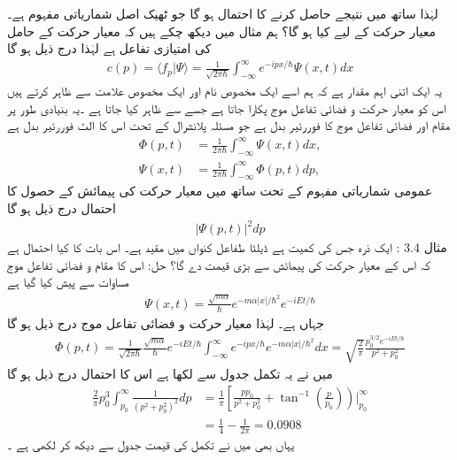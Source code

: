 لہٰذا ساتھ  میں نتیجے حاصل کرنے کا احتمال  ہو گا جو ٹھیک اصل شماریاتی مفہوم ہے۔
معیار حرکت کے لیے کیا ہو گا؟ ہم مثال  میں دیکھ چکے ہیں کہ معیار حرکت کے حامل کی امتیازی تفاعل  ہے لہٰذا درج ذیل ہو گا
\begin{align}
c(p) = \langle f_{p}  | \Psi \rangle = \frac{1}{\sqrt{2\pi\hbar}} \int_{-\infty}^{\infty} e^{-ipx/\hbar} \Psi (x,t)dx
\end{align}
یہ ایک اتنی اہم مقدار ہے کہ ہم اسے ایک مخصوص نام اور ایک مخصوص علامت سے ظاہر کرتے ہیں اس کو معیار حرکت و فضائی تفاعل موج پکارا جاتا ہے جسے  سے ظاہر کیا جاتا ہے ۔یہ بنیادی طور پر مقام اور فضائی تفاعل موج  کا فوررئیر بدل ہے جو مسئلہ پلانشرال کے تحت اس کا الٹ فوررئیر بدل ہے
\begin{align}
\Phi(p,t) &= \frac{1}{2\pi\hbar} \int_{-\infty}^{\infty} \Psi (x,t) dx, \\ 
\Psi(x,t) &= \frac{1}{2\pi\hbar} \int_{-\infty}^{\infty} \Phi (p,t) dp,
\end{align}
عمومی شماریاتی مفہوم کے تحت ساتھ  میں معیار حرکت کی پیمائش کے حصول کا احتمال درج ذیل ہو گا 
\begin{align}
| \Psi(p,t)|^{2}dp
\end{align}
مثال 3.4 : ایک ذرہ جس کی کمیت  ہے ڈیلٹا طفاعل کنواں  میں مقید ہے۔ اس بات کا کیا احتمال ہے کہ اس کے معیار حرکت کی پیمائش  سے بڑی قیمت دے گا؟ 
حل: اس کا مقام و فضائی تفاعل موج مساوات  سے پیش کیا گیا ہے
\begin{align}
\Psi(x,t) = \frac{\sqrt{m\alpha}}{\hbar} e^{-m\alpha|x|/\hbar^{2}}e^{-iEt/\hbar}
\end{align}
 جہاں  ہے۔ لہٰذا معیار حرکت و فضائی تفاعل موج درج ذیل ہو گا
\begin{align*}
\Phi(p,t) = \frac{1}{\sqrt{2\pi\hbar}} \frac{\sqrt{m\alpha}}{\hbar} e^{-iEt/\hbar} \int_{-\infty}^{\infty} e^{-ipx/\hbar} e^{-m\alpha|x|/\hbar^{2}}dx = \sqrt{\frac{2}{\pi}} \frac{p_{0}^{3/2}e^{-iEt/\hbar}}{p^{2}+p_{0}^{2}}
\end{align*}
میں نے یہ تکمل جدول سے لکھا ہے اس کا احتمال درج ذیل ہو گا 
\begin{align*}
\frac{2}{\pi} p_{0}^{3}\int_{p_{0}}^{\infty} \frac{1}{(p^{2}+p_{0}^{2})^{2}}dp &= \frac{1}{\pi} \left[ \frac{pp_{0}}{p^{2}+p_{0}^{2}} + \tan^{-1}\left( \frac{p}{p_{0}} \right) \right) \bigg|_{p_{0}}^{\infty} \\
&= \frac{1}{4} - \frac{1}{2\pi} = 0.0908
\end{align*}
یہاں بھی میں نے تکمل کی قیمت جدول سے دیکھ کر لکھی ہے ۔



